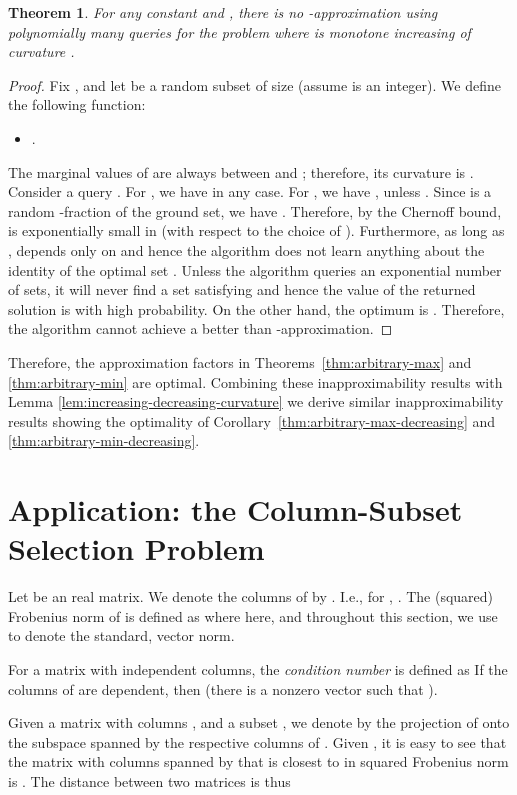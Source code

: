 \documentclass{article}
\newtheorem{theorem}{Theorem}[section]
\theoremstyle{definition}
\begin{document}
\begin{theorem}
\label{thm:curvature-max-hardness}
For any constant  and , there is no -approximation using polynomially many queries for the problem  where  is monotone increasing of curvature .
\end{theorem}


\begin{proof}
Fix ,  and let  be a random subset of size  (assume  is an integer). We define the following function:
\begin{itemize}
\item .
\end{itemize}
The marginal values of  are always between  and ; therefore, its curvature is .
Consider a query .
For , we have  in any case. For , we have , unless
. Since  is a random -fraction of the ground set, we have .
Therefore, by the Chernoff bound,  is exponentially small in  (with respect to the choice of ).
Furthermore, as long as ,  depends only on  and hence the algorithm does not learn anything about the identity of the optimal set . Unless the algorithm queries an exponential number of sets, it will never find a set  satisfying  and hence the value of the returned solution is  with high probability. On the other hand, the optimum is . Therefore, the algorithm cannot achieve a better than -approximation.
\end{proof}

Therefore, the approximation factors in Theorems~\ref{thm:arbitrary-max} and \ref{thm:arbitrary-min} are optimal.
Combining these inapproximability results with Lemma \ref{lem:increasing-decreasing-curvature} we derive similar inapproximability results showing the optimality of Corollary~\ref{thm:arbitrary-max-decreasing} and \ref{thm:arbitrary-min-decreasing}.


\section{Application: the Column-Subset Selection Problem}\label{application}


Let  be an  real matrix. We denote the columns of  by . I.e., for ,
. The (squared) Frobenius norm of  is defined as  where here, and throughout this section, we use  to denote the standard,  vector norm.

For a matrix  with independent columns, the {\em condition number} is defined as
  If the columns of  are dependent, then  (there is a nonzero vector  such that ).

Given a matrix  with columns , and a subset , we denote by  the projection of  onto the subspace spanned by the respective columns of .
Given , it is easy to see that the matrix  with columns spanned by  that is closest to  in squared Frobenius norm is . The distance between  two matrices is thus
\end{document}
